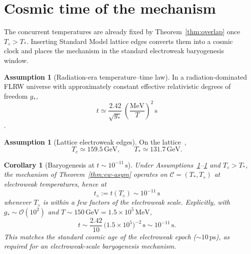 \documentclass[11pt]{article}
\newtheorem{corollary}[theorem]{Corollary}
\theoremstyle{definition}
\newtheorem{assumption}[theorem]{Assumption}
\theoremstyle{remark}
\newcommand{\Td}{T_{\diamond}}
\begin{document}
\section{Cosmic time of the mechanism}
\label{sec:time}
The concurrent temperatures are already fixed by Theorem~\ref{thm:overlap} once
$\Td>T_*$.
Inserting Standard Model lattice edges converts them into a cosmic clock and
places the mechanism in the standard electroweak baryogenesis window.

\begin{assumption}[Radiation-era temperature--time law]
\label{ass:radiation}
In a radiation-dominated FLRW universe with approximately constant effective
relativistic degrees of freedom $g_*$,
\begin{equation}
\label{eq:Tt}
\boxed{t\simeq\frac{2.42}{\sqrt{g_*}}\,\left(\frac{\mathrm{MeV}}{T}\right)^{\!2}\,\mathrm{s}}
\end{equation}
\cite{KolbTurner1990}.
\end{assumption}

\begin{assumption}[Lattice electroweak edges]
\label{ass:lattice}
On the lattice~\cite{DOnofrio2014},
\begin{equation}
\label{eq:lattice}
T_c\simeq159.5\,\mathrm{GeV},
\qquad
T_*\simeq131.7\,\mathrm{GeV}.
\end{equation}
\end{assumption}

\begin{corollary}[Baryogenesis at $t\sim10^{-11}\,\mathrm{s}$]
\label{cor:tdiamond}
Under Assumptions~\ref{ass:radiation}--\ref{ass:lattice} and $\Td>T_*$, the
mechanism of Theorem~\ref{thm:ew-asym} operates on $\mathcal C=(T_*,\Td)$ at
electroweak temperatures, hence at
\begin{equation}
\label{eq:tdiamond}
\boxed{t_\diamond:=t(\Td)\sim10^{-11}\,\mathrm{s}}
\end{equation}
whenever $\Td$ is within a few factors of the electroweak scale.
Explicitly, with $g_*\sim\mathcal O(10^2)$ and
$T\sim150\,\mathrm{GeV}=1.5\times10^5\,\mathrm{MeV}$,
\[
t\sim\frac{2.42}{10}\,\bigl(1.5\times10^5\bigr)^{-2}\,\mathrm{s}
\sim10^{-11}\,\mathrm{s}.
\]
This matches the standard cosmic age of the electroweak epoch
($\sim10\,\mathrm{ps}$), as required for an electroweak-scale baryogenesis
mechanism.
\end{corollary}
\end{document}
